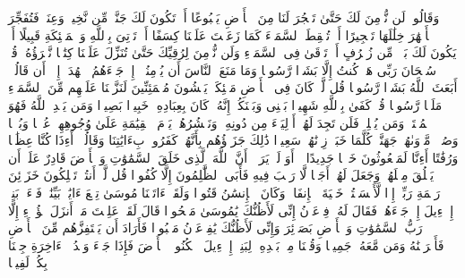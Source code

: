وَقَالُوا۟ لَن نُّؤۡمِنَ لَكَ حَتَّىٰ تَفۡجُرَ لَنَا مِنَ ٱلۡأَرۡضِ یَنۢبُوعًا%
\stopbuffer
\startbuffer[\q:17:91]
أَوۡ تَكُونَ لَكَ جَنَّةࣱ مِّن نَّخِیلࣲ وَعِنَبࣲ فَتُفَجِّرَ ٱلۡأَنۡهَٰرَ خِلَٰلَهَا تَفۡجِیرًا%
\stopbuffer
\startbuffer[\q:17:92]
أَوۡ تُسۡقِطَ ٱلسَّمَاۤءَ كَمَا زَعَمۡتَ عَلَیۡنَا كِسَفًا أَوۡ تَأۡتِیَ بِٱللَّهِ وَٱلۡمَلَٰۤئِكَةِ قَبِیلًا%
\stopbuffer
\startbuffer[\q:17:93]
أَوۡ یَكُونَ لَكَ بَیۡتࣱ مِّن زُخۡرُفٍ أَوۡ تَرۡقَىٰ فِی ٱلسَّمَاۤءِ وَلَن نُّؤۡمِنَ لِرُقِیِّكَ حَتَّىٰ تُنَزِّلَ عَلَیۡنَا كِتَٰبࣰا نَّقۡرَؤُهُۥۗ قُلۡ سُبۡحَانَ رَبِّی هَلۡ كُنتُ إِلَّا بَشَرࣰا رَّسُولࣰا%
\stopbuffer
\startbuffer[\q:17:94]
وَمَا مَنَعَ ٱلنَّاسَ أَن یُؤۡمِنُوۤا۟ إِذۡ جَاۤءَهُمُ ٱلۡهُدَىٰۤ إِلَّاۤ أَن قَالُوۤا۟ أَبَعَثَ ٱللَّهُ بَشَرࣰا رَّسُولࣰا%
\stopbuffer
\startbuffer[\q:17:95]
قُل لَّوۡ كَانَ فِی ٱلۡأَرۡضِ مَلَٰۤئِكَةࣱ یَمۡشُونَ مُطۡمَئِنِّینَ لَنَزَّلۡنَا عَلَیۡهِم مِّنَ ٱلسَّمَاۤءِ مَلَكࣰا رَّسُولࣰا%
\stopbuffer
\startbuffer[\q:17:96]
قُلۡ كَفَىٰ بِٱللَّهِ شَهِیدَۢا بَیۡنِی وَبَیۡنَكُمۡۚ إِنَّهُۥ كَانَ بِعِبَادِهِۦ خَبِیرَۢا بَصِیرࣰا%
\stopbuffer
\startbuffer[\q:17:97]
وَمَن یَهۡدِ ٱللَّهُ فَهُوَ ٱلۡمُهۡتَدِۖ وَمَن یُضۡلِلۡ فَلَن تَجِدَ لَهُمۡ أَوۡلِیَاۤءَ مِن دُونِهِۦۖ وَنَحۡشُرُهُمۡ یَوۡمَ ٱلۡقِیَٰمَةِ عَلَىٰ وُجُوهِهِمۡ عُمۡیࣰا وَبُكۡمࣰا وَصُمࣰّاۖ مَّأۡوَىٰهُمۡ جَهَنَّمُۖ كُلَّمَا خَبَتۡ زِدۡنَٰهُمۡ سَعِیرࣰا%
\stopbuffer
\startbuffer[\q:17:98]
ذَٰلِكَ جَزَاۤؤُهُم بِأَنَّهُمۡ كَفَرُوا۟ بِءَایَٰتِنَا وَقَالُوۤا۟ أَءِذَا كُنَّا عِظَٰمࣰا وَرُفَٰتًا أَءِنَّا لَمَبۡعُوثُونَ خَلۡقࣰا جَدِیدًا%
\stopbuffer
\startbuffer[\q:17:99]
۞ أَوَ لَمۡ یَرَوۡا۟ أَنَّ ٱللَّهَ ٱلَّذِی خَلَقَ ٱلسَّمَٰوَٰتِ وَٱلۡأَرۡضَ قَادِرٌ عَلَىٰۤ أَن یَخۡلُقَ مِثۡلَهُمۡ وَجَعَلَ لَهُمۡ أَجَلࣰا لَّا رَیۡبَ فِیهِ فَأَبَى ٱلظَّٰلِمُونَ إِلَّا كُفُورࣰا%
\stopbuffer
\startbuffer[\q:17:100]
قُل لَّوۡ أَنتُمۡ تَمۡلِكُونَ خَزَاۤئِنَ رَحۡمَةِ رَبِّیۤ إِذࣰا لَّأَمۡسَكۡتُمۡ خَشۡیَةَ ٱلۡإِنفَاقِۚ وَكَانَ ٱلۡإِنسَٰنُ قَتُورࣰا%
\stopbuffer
\startbuffer[\q:17:101]
وَلَقَدۡ ءَاتَیۡنَا مُوسَىٰ تِسۡعَ ءَایَٰتِۭ بَیِّنَٰتࣲۖ فَسۡءَلۡ بَنِیۤ إِسۡرَٰۤءِیلَ إِذۡ جَاۤءَهُمۡ فَقَالَ لَهُۥ فِرۡعَوۡنُ إِنِّی لَأَظُنُّكَ یَٰمُوسَىٰ مَسۡحُورࣰا%
\stopbuffer
\startbuffer[\q:17:102]
قَالَ لَقَدۡ عَلِمۡتَ مَاۤ أَنزَلَ هَٰۤؤُلَاۤءِ إِلَّا رَبُّ ٱلسَّمَٰوَٰتِ وَٱلۡأَرۡضِ بَصَاۤئِرَ وَإِنِّی لَأَظُنُّكَ یَٰفِرۡعَوۡنُ مَثۡبُورࣰا%
\stopbuffer
\startbuffer[\q:17:103]
فَأَرَادَ أَن یَسۡتَفِزَّهُم مِّنَ ٱلۡأَرۡضِ فَأَغۡرَقۡنَٰهُ وَمَن مَّعَهُۥ جَمِیعࣰا%
\stopbuffer
\startbuffer[\q:17:104]
وَقُلۡنَا مِنۢ بَعۡدِهِۦ لِبَنِیۤ إِسۡرَٰۤءِیلَ ٱسۡكُنُوا۟ ٱلۡأَرۡضَ فَإِذَا جَاۤءَ وَعۡدُ ٱلۡءَاخِرَةِ جِئۡنَا بِكُمۡ لَفِیفࣰا%
\stopbuffer
